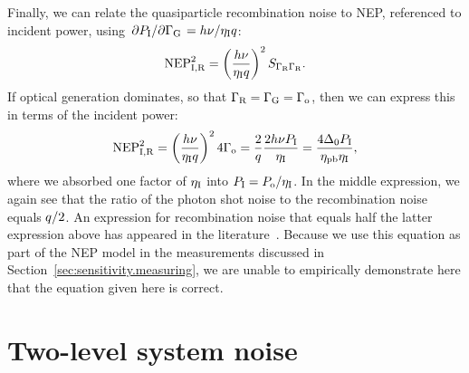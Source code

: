 Finally, we can relate the quasiparticle recombination noise to NEP, referenced to incident power, using
$\pdv*{P_{\mathrm{I}}}{\Gamma_{\mathrm{G}}} = h \nu / \eta_{\mathrm{I}} q$:
\begin{equation}
\mathrm{NEP}^2_{\mathrm{I}, \mathrm{R}}
  =
  \left( \frac{h \nu}{\eta_{\mathrm{I}} q} \right)^2 S_{\Gamma_{\mathrm{R}} \Gamma_{\mathrm{R}}}.
\end{equation}
If optical generation dominates, so that $\Gamma_{\mathrm{R}} = \Gamma_{\mathrm{G}} = \Gamma_{\mathrm{o}}$, then we can express this in terms of the incident power:
\begin{equation}
\mathrm{NEP}^2_{\mathrm{I}, \mathrm{R}}
  =
  \left( \frac{h \nu}{\eta_{\mathrm{I}} q} \right)^2 4 \Gamma_{\mathrm{o}}
  =
  \frac{2}{q} \frac{2 h \nu P_{\mathrm{I}}}{\eta_{\mathrm{I}}}
  =
  \frac{4 \Delta_0 P_{\mathrm{I}}}{\eta_\mathrm{pb} \eta_{\mathrm{I}}},
\end{equation}
where we absorbed one factor of $\eta_{\mathrm{I}}$ into $P_{\mathrm{I}} = P_{\mathrm{o}} / \eta_{\mathrm{I}}$.
In the middle expression, we again see that the ratio of the photon shot noise to the recombination noise equals $q / 2$.
An expression for recombination noise that equals half the latter expression above has appeared in the literature~\autocite{Yates2011APL,Janssen2013APL,deVisser2014NatComm,Hubmayr2015APL,McCarrick2014RSI}.
Because we use this equation as part of the NEP model in the measurements discussed in Section~\ref{sec:sensitivity.measuring}, we are unable to empirically demonstrate here that the equation given here is correct.

\section{Two-level system noise}
\label{sec:sensitivity.tls}

